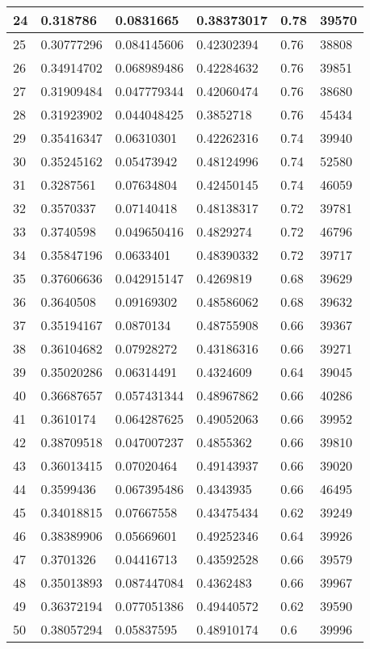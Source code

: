 \begin{longtable}{|l|l|l|l|l|l|}
24 & 0.318786 & 0.0831665 & 0.38373017 & 0.78 & 39570 \\ \hline 
25 & 0.30777296 & 0.084145606 & 0.42302394 & 0.76 & 38808 \\ \hline 
26 & 0.34914702 & 0.068989486 & 0.42284632 & 0.76 & 39851 \\ \hline 
27 & 0.31909484 & 0.047779344 & 0.42060474 & 0.76 & 38680 \\ \hline 
28 & 0.31923902 & 0.044048425 & 0.3852718 & 0.76 & 45434 \\ \hline 
29 & 0.35416347 & 0.06310301 & 0.42262316 & 0.74 & 39940 \\ \hline 
30 & 0.35245162 & 0.05473942 & 0.48124996 & 0.74 & 52580 \\ \hline 
31 & 0.3287561 & 0.07634804 & 0.42450145 & 0.74 & 46059 \\ \hline 
32 & 0.3570337 & 0.07140418 & 0.48138317 & 0.72 & 39781 \\ \hline 
33 & 0.3740598 & 0.049650416 & 0.4829274 & 0.72 & 46796 \\ \hline 
34 & 0.35847196 & 0.0633401 & 0.48390332 & 0.72 & 39717 \\ \hline 
35 & 0.37606636 & 0.042915147 & 0.4269819 & 0.68 & 39629 \\ \hline 
36 & 0.3640508 & 0.09169302 & 0.48586062 & 0.68 & 39632 \\ \hline 
37 & 0.35194167 & 0.0870134 & 0.48755908 & 0.66 & 39367 \\ \hline 
38 & 0.36104682 & 0.07928272 & 0.43186316 & 0.66 & 39271 \\ \hline 
39 & 0.35020286 & 0.06314491 & 0.4324609 & 0.64 & 39045 \\ \hline 
40 & 0.36687657 & 0.057431344 & 0.48967862 & 0.66 & 40286 \\ \hline 
41 & 0.3610174 & 0.064287625 & 0.49052063 & 0.66 & 39952 \\ \hline 
42 & 0.38709518 & 0.047007237 & 0.4855362 & 0.66 & 39810 \\ \hline 
43 & 0.36013415 & 0.07020464 & 0.49143937 & 0.66 & 39020 \\ \hline 
44 & 0.3599436 & 0.067395486 & 0.4343935 & 0.66 & 46495 \\ \hline 
45 & 0.34018815 & 0.07667558 & 0.43475434 & 0.62 & 39249 \\ \hline 
46 & 0.38389906 & 0.05669601 & 0.49252346 & 0.64 & 39926 \\ \hline 
47 & 0.3701326 & 0.04416713 & 0.43592528 & 0.66 & 39579 \\ \hline 
48 & 0.35013893 & 0.087447084 & 0.4362483 & 0.66 & 39967 \\ \hline 
49 & 0.36372194 & 0.077051386 & 0.49440572 & 0.62 & 39590 \\ \hline 
50 & 0.38057294 & 0.05837595 & 0.48910174 & 0.6 & 39996 \\ \hline 
\end{longtable}